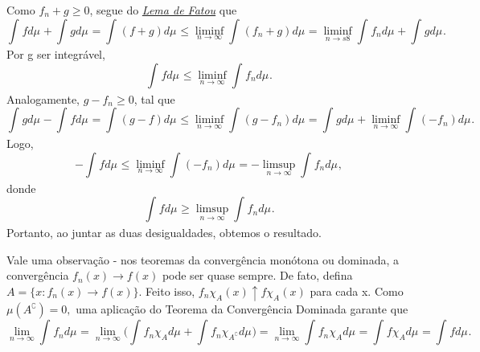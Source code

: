 \documentclass[measure_theory.tex]{subfiles}
\begin{document}
\begin{proof*}
	Como \(f_{n} +g \geq 0\), segue do \hyperlink{fatou}{\textit{Lema de Fatou}} que
	\[
		\int_{}f d\mu_{} + \int_{}g d\mu_{} = \int_{}(f+g) d\mu_{} \leq \liminf_{n\to \infty}\int_{}(f_{n}+g) d\mu_{} = \liminf_{n\to s8}\int_{}f_{n} d\mu_{} + \int_{}g d\mu_{}.
	\]
	Por g ser integrável,
	\[
		\int_{}f d\mu_{} \leq \liminf_{n\to \infty}\int_{}f_{n} d\mu_{}.
	\]
	Analogamente, \(g-f_{n}\geq 0\), tal que
	\[
		\int_{}g d\mu_{} - \int_{}f d\mu_{} = \int_{}(g-f) d\mu_{} \leq \liminf_{n\to \infty}\int_{}(g-f_{n}) d\mu_{} = \int_{}g d\mu_{} + \liminf_{n\to \infty}\int_{}(-f_{n}) d\mu_{}.
	\]
	Logo,
	\[
		-\int_{}f d\mu_{} \leq \liminf_{n\to \infty}\int_{}(-f_{n}) d\mu_{} = - \limsup_{n\to \infty}\int_{}f_{n} d\mu_{},
	\]
	donde
	\[
		\int_{}f d\mu_{} \geq \limsup_{n\to \infty}\int_{}f_{n} d\mu_{}.
	\]
	Portanto, ao juntar as duas desigualdades, obtemos o resultado. \qedsymbol
\end{proof*}
Vale uma observação - nos teoremas da convergência monótona ou dominada, a convergência \(f_{n}(x)\to f(x)\) pode ser quase sempre. De fato, defina \(A = \{x:f_{n}(x)\to f(x)\}.\) Feito isso,
\(f_{n}\chi_{A}(x)\uparrow f \chi_{A}(x)\) para cada x. Como \(\mu (A ^{\complement}) = 0, \) uma aplicação do \hypertarget{dominated_convergence}{Teorema da Convergência Dominada} garante que
\[
	\lim_{n\to \infty}\int_{}f_{n} d\mu_{} = \lim_{n\to \infty}\biggl(\int_{}f_{n} \chi_{A} d\mu_{} + \int_{}f_{n}\chi_{A ^{\complement}} d\mu_{}\biggr) = \lim_{n\to \infty}\int_{}f_{n}\chi_{A} d\mu_{} = \int_{}f \chi_{A} d\mu_{} = \int_{}f d\mu_{}.
\]
\end{document}
